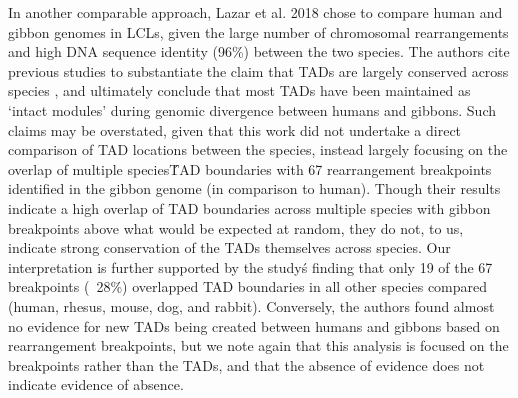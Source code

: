 In another comparable approach, Lazar et al. 2018 \cite{Lazar.2018} chose to compare human and gibbon genomes in LCLs, given the large number of chromosomal rearrangements and high DNA sequence identity (96\%) between the two species. The authors cite previous studies to substantiate the claim that TADs are largely conserved across species \cite{Dixon.2012, Rudan.2015}, and ultimately conclude that most TADs have been maintained as `intact modules' during genomic divergence between humans and gibbons. Such claims may be overstated, given that this work did not undertake a direct comparison of TAD locations between the species, instead largely focusing on the overlap of multiple species\' TAD boundaries with 67 rearrangement breakpoints identified in the gibbon genome (in comparison to human). Though their results indicate a high overlap of TAD boundaries across multiple species with gibbon breakpoints above what would be expected at random, they do not, to us, indicate strong conservation of the TADs themselves across species. Our interpretation is further supported by the study\'s finding that only 19 of the 67 breakpoints (~28\%) overlapped TAD boundaries in all other species compared (human, rhesus, mouse, dog, and rabbit). Conversely, the authors found almost no evidence for new TADs being created between humans and gibbons based on rearrangement breakpoints, but we note again that this analysis is focused on the breakpoints rather than the TADs, and that the absence of evidence does not indicate evidence of absence.

